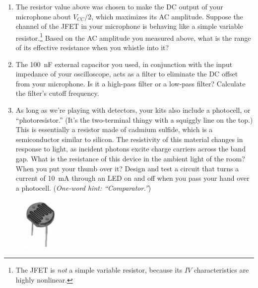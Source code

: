 \begin{enumerate}[wide]
\item The resistor value above was chosen to make the DC output of your microphone about $V_{CC}/2$, which maximizes its AC amplitude.  Suppose the channel of the JFET in your microphone is behaving like a simple variable resistor.\footnote{The JFET is \textit{not} a simple variable resistor, because its $IV$ characteristics are highly nonlinear.}  Based on the AC amplitude you measured above, what is the range of its effective resistance when you whistle into it?


\item The 100~nF external capacitor you used, in conjunction with the input impedance of your oscilloscope, acts as a filter to eliminate the DC offset from your microphone.  Is it a high-pass filter or a low-pass filter?  Calculate the filter's cutoff frequency.

\item As long as we're playing with detectors, your kits also include a photocell, or ``photoresistor.''  (It's the two-terminal thingy with a squiggly line on 
the top.) This is essentially a resistor made 
of cadmium sulfide, which is a semiconductor similar to silicon.  The resistivity of this material changes in response to light, 
as incident photons excite charge carriers across the band gap.  What is the resistance of this device in the ambient light of the room?  When you put your thumb over it?  Design and test a circuit that turns a current of 10~mA through an LED on and off  when you pass your hand over a photocell.  (\textit{One-word hint: ``Comparator.''})
\begin{center}
\includegraphics[width=1in]{microphone_photocell/photocell_bw.eps}
\end{center}


\end{enumerate}

